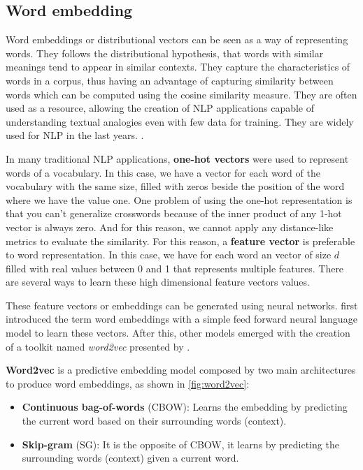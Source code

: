 \subsection{Word embedding}\label{chap:background:we}

Word embeddings or distributional vectors can be seen as a way of representing words. They follows the distributional hypothesis, that words with similar meanings tend to appear in similar contexts. They capture the characteristics of words in a corpus, thus having an advantage of capturing similarity between words which can be computed using the cosine similarity measure. They are often used as a resource, allowing the creation of NLP applications capable of understanding textual analogies even with few data for training. They are widely used for NLP in the last years. \cite{DBLP:journals/corr/abs-1708-02709, Harris1954, Hartmann2017}.

In many traditional NLP applications, \textbf{one-hot vectors} were used to represent words of a vocabulary. In this case, we have a vector for each word of the vocabulary with the same size, filled with zeros beside the position of the word where we have the value one. 
One problem of using the one-hot representation is that you can't generalize crosswords because of the inner product of any 1-hot vector is always zero. And for this reason, we cannot apply any distance-like metrics to evaluate the similarity. For this reason, a \textbf{feature vector} is preferable to word representation. In this case, we have for each word an vector of size $d$ filled with real values between 0 and 1 that represents multiple features. There are several ways to learn these high dimensional feature vectors values. 

These feature vectors or embeddings can be generated using neural networks.  first introduced the term word embeddings with a simple feed forward neural language model to learn these vectors. After this, other models emerged with the creation of a toolkit named \textit{word2vec} presented by .

\textbf{Word2vec} is a predictive embedding model composed by two main architectures to produce word embeddings, as shown in \autoref{fig:word2vec}:

\begin{itemize}
    \item \textbf{Continuous bag-of-words} (CBOW): Learns the embedding by predicting the current word based on their surrounding words (context).
    \item \textbf{Skip-gram} (SG): It is the opposite of CBOW, it learns by predicting the surrounding words (context) given a current word.
\end{itemize}

